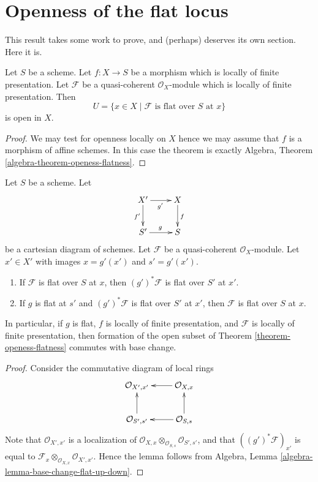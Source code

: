 \section{Openness of the flat locus}
\label{section-open-flat}

\noindent
This result takes some work to prove, and (perhaps)
deserves its own section. Here it is.

\begin{theorem}
\label{theorem-openess-flatness}
Let $S$ be a scheme.
Let $f : X \to S$ be a morphism which is locally of finite presentation.
Let $\mathcal{F}$ be a quasi-coherent $\mathcal{O}_X$-module which is
locally of finite presentation. Then
$$
U = \{x \in X \mid \mathcal{F}\text{ is flat over }S\text{ at }x\}
$$
is open in $X$.
\end{theorem}

\begin{proof}
We may test for openness locally on $X$ hence we may assume
that $f$ is a morphism of affine schemes. In this case the
theorem is exactly
Algebra, Theorem \ref{algebra-theorem-openess-flatness}.
\end{proof}

\begin{lemma}
\label{lemma-flat-locus-base-change}
Let $S$ be a scheme.
Let
$$
\xymatrix{
X' \ar[r]_{g'} \ar[d]_{f'} & X \ar[d]^f \\
S' \ar[r]^g & S
}
$$
be a cartesian diagram of schemes.
Let $\mathcal{F}$ be a quasi-coherent $\mathcal{O}_X$-module.
Let $x' \in X'$ with images
$x = g'(x')$ and $s' = g'(x')$.
\begin{enumerate}
\item If $\mathcal{F}$ is flat over $S$ at $x$, then
$(g')^*\mathcal{F}$ is flat over $S'$ at $x'$.
\item If $g$ is flat at $s'$ and $(g')^*\mathcal{F}$ is flat over $S'$ at
$x'$, then $\mathcal{F}$ is flat over $S$ at $x$.
\end{enumerate}
In particular, if $g$ is flat, $f$ is locally of finite presentation,
and $\mathcal{F}$ is locally of finite presentation,
then formation of the open subset of
Theorem \ref{theorem-openess-flatness}
commutes with base change.
\end{lemma}

\begin{proof}
Consider the commutative diagram of local rings
$$
\xymatrix{
\mathcal{O}_{X', x'} & \mathcal{O}_{X, x} \ar[l] \\
\mathcal{O}_{S', s'} \ar[u] & \mathcal{O}_{S, s} \ar[l] \ar[u]
}
$$
Note that $\mathcal{O}_{X', x'}$
is a localization of
$\mathcal{O}_{X, x} \otimes_{\mathcal{O}_{S, s}} \mathcal{O}_{S', s'}$,
and that $((g')^*\mathcal{F})_{x'}$ is equal to
$\mathcal{F}_x \otimes_{\mathcal{O}_{X, x}} \mathcal{O}_{X', x'}$.
Hence the lemma follows from
Algebra, Lemma \ref{algebra-lemma-base-change-flat-up-down}.
\end{proof}






